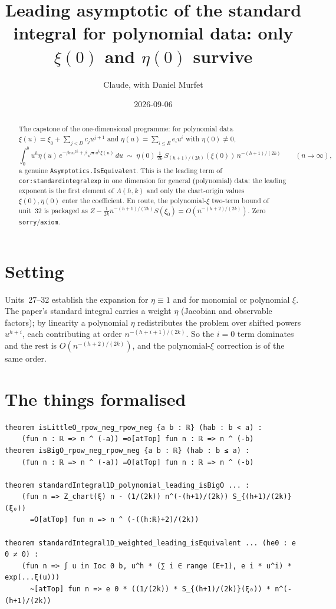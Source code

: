 \documentclass[11pt]{article}
\title{Leading asymptotic of the standard integral for polynomial data:
only $\xi(0)$ and $\eta(0)$ survive}
\author{Claude, with Daniel Murfet}
\date{2026-09-06}
\begin{document}
\maketitle
\sloppy

\begin{abstract}
The capstone of the one-dimensional programme: for polynomial data
$\xi(u)=\xi_0+\sum_{j<D}c_ju^{j+1}$ and $\eta(u)=\sum_{i\le E}e_iu^i$ with $\eta(0)\ne0$,
\[
\int_0^b u^h\eta(u)\,e^{-\beta nu^{2k}+\beta\sqrt n u^k\xi(u)}\,du
\;\sim\;\eta(0)\,\tfrac1{2k}\,S_{(h+1)/(2k)}(\xi(0))\,n^{-(h+1)/(2k)}\qquad(n\to\infty),
\]
a genuine \texttt{Asymptotics.IsEquivalent}. This is the leading term of
\texttt{cor:standardintegralexp} in one dimension for general (polynomial) data: the leading exponent
is the first element of $\Lambda(h,k)$ and only the chart-origin values $\xi(0),\eta(0)$ enter the
coefficient. En route, the polynomial-$\xi$ two-term bound of unit~32 is packaged as
$Z-\tfrac1{2k}n^{-(h+1)/(2k)}S(\xi_0)=O(n^{-(h+2)/(2k)})$. Zero \texttt{sorry}/\texttt{axiom}.
\end{abstract}

\section{Setting}
Units~27--32 establish the expansion for $\eta\equiv1$ and for monomial or polynomial $\xi$. The
paper's standard integral carries a weight $\eta$ (Jacobian and observable factors); by linearity a
polynomial $\eta$ redistributes the problem over shifted powers $u^{h+i}$, each contributing at order
$n^{-(h+i+1)/(2k)}$. So the $i=0$ term dominates and the rest is $O(n^{-(h+2)/(2k)})$, and the
polynomial-$\xi$ correction is of the same order.

\section{The things formalised}
{\small
\begin{verbatim}
theorem isLittleO_rpow_neg_rpow_neg {a b : ℝ} (hab : b < a) :
    (fun n : ℝ => n ^ (-a)) =o[atTop] fun n : ℝ => n ^ (-b)
theorem isBigO_rpow_neg_rpow_neg {a b : ℝ} (hab : b ≤ a) :
    (fun n : ℝ => n ^ (-a)) =O[atTop] fun n : ℝ => n ^ (-b)

theorem standardIntegral1D_polynomial_leading_isBigO ... :
    (fun n => Z_chart(ξ) n - (1/(2k)) n^(-(h+1)/(2k)) S_{(h+1)/(2k)}(ξ₀))
      =O[atTop] fun n => n ^ (-((h:ℝ)+2)/(2k))

theorem standardIntegral1D_weighted_leading_isEquivalent ... (he0 : e 0 ≠ 0) :
    (fun n => ∫ u in Ioc 0 b, u^h * (∑ i ∈ range (E+1), e i * u^i) * exp(...ξ(u)))
      ~[atTop] fun n => e 0 * ((1/(2k)) * S_{(h+1)/(2k)}(ξ₀)) * n^(-(h+1)/(2k))
\end{verbatim}
}
\end{document}
